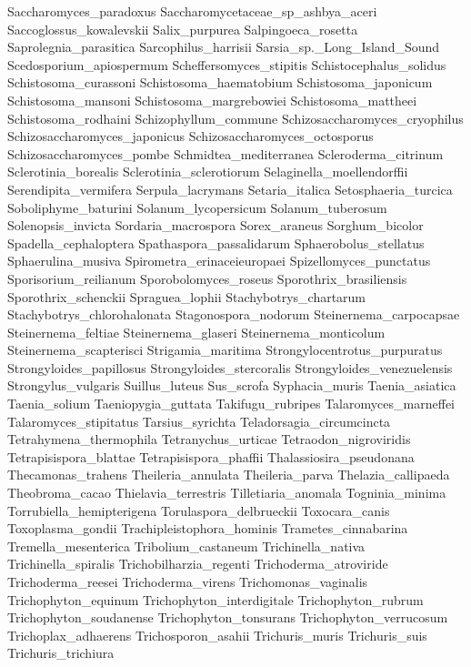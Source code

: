 \documentclass[letterpaper,10pt,english]{sphinxmanual}
\begin{document}
{\begin{sphinxVerbatim}[commandchars=\\\{\}]
Saccharomyces\_paradoxus
Saccharomycetaceae\_sp\_ashbya\_aceri
Saccoglossus\_kowalevskii
Salix\_purpurea
Salpingoeca\_rosetta
Saprolegnia\_parasitica
Sarcophilus\_harrisii
Sarsia\_sp.\_Long\_Island\_Sound
Scedosporium\_apiospermum
Scheffersomyces\_stipitis
Schistocephalus\_solidus
Schistosoma\_curassoni
Schistosoma\_haematobium
Schistosoma\_japonicum
Schistosoma\_mansoni
Schistosoma\_margrebowiei
Schistosoma\_mattheei
Schistosoma\_rodhaini
Schizophyllum\_commune
Schizosaccharomyces\_cryophilus
Schizosaccharomyces\_japonicus
Schizosaccharomyces\_octosporus
Schizosaccharomyces\_pombe
Schmidtea\_mediterranea
Scleroderma\_citrinum
Sclerotinia\_borealis
Sclerotinia\_sclerotiorum
Selaginella\_moellendorffii
Serendipita\_vermifera
Serpula\_lacrymans
Setaria\_italica
Setosphaeria\_turcica
Soboliphyme\_baturini
Solanum\_lycopersicum
Solanum\_tuberosum
Solenopsis\_invicta
Sordaria\_macrospora
Sorex\_araneus
Sorghum\_bicolor
Spadella\_cephaloptera
Spathaspora\_passalidarum
Sphaerobolus\_stellatus
Sphaerulina\_musiva
Spirometra\_erinaceieuropaei
Spizellomyces\_punctatus
Sporisorium\_reilianum
Sporobolomyces\_roseus
Sporothrix\_brasiliensis
Sporothrix\_schenckii
Spraguea\_lophii
Stachybotrys\_chartarum
Stachybotrys\_chlorohalonata
Stagonospora\_nodorum
Steinernema\_carpocapsae
Steinernema\_feltiae
Steinernema\_glaseri
Steinernema\_monticolum
Steinernema\_scapterisci
Strigamia\_maritima
Strongylocentrotus\_purpuratus
Strongyloides\_papillosus
Strongyloides\_stercoralis
Strongyloides\_venezuelensis
Strongylus\_vulgaris
Suillus\_luteus
Sus\_scrofa
Syphacia\_muris
Taenia\_asiatica
Taenia\_solium
Taeniopygia\_guttata
Takifugu\_rubripes
Talaromyces\_marneffei
Talaromyces\_stipitatus
Tarsius\_syrichta
Teladorsagia\_circumcincta
Tetrahymena\_thermophila
Tetranychus\_urticae
Tetraodon\_nigroviridis
Tetrapisispora\_blattae
Tetrapisispora\_phaffii
Thalassiosira\_pseudonana
Thecamonas\_trahens
Theileria\_annulata
Theileria\_parva
Thelazia\_callipaeda
Theobroma\_cacao
Thielavia\_terrestris
Tilletiaria\_anomala
Togninia\_minima
Torrubiella\_hemipterigena
Torulaspora\_delbrueckii
Toxocara\_canis
Toxoplasma\_gondii
Trachipleistophora\_hominis
Trametes\_cinnabarina
Tremella\_mesenterica
Tribolium\_castaneum
Trichinella\_nativa
Trichinella\_spiralis
Trichobilharzia\_regenti
Trichoderma\_atroviride
Trichoderma\_reesei
Trichoderma\_virens
Trichomonas\_vaginalis
Trichophyton\_equinum
Trichophyton\_interdigitale
Trichophyton\_rubrum
Trichophyton\_soudanense
Trichophyton\_tonsurans
Trichophyton\_verrucosum
Trichoplax\_adhaerens
Trichosporon\_asahii
Trichuris\_muris
Trichuris\_suis
Trichuris\_trichiura

\end{sphinxVerbatim}}
\end{document}

